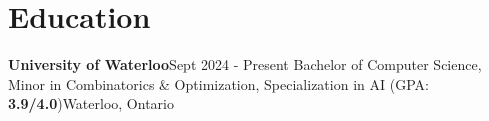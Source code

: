 \section{\color{ResumeColor}\textbf{Education}}
    \resumeSubHeadingListStart

    \resumeSubheading
    {\textbf{University of Waterloo}}{Sept 2024 - Present}
    {Bachelor of Computer Science, Minor in Combinatorics \& Optimization, Specialization in AI (GPA: \textbf{3.9/4.0})}{Waterloo, Ontario}

    \resumeSubHeadingListEnd